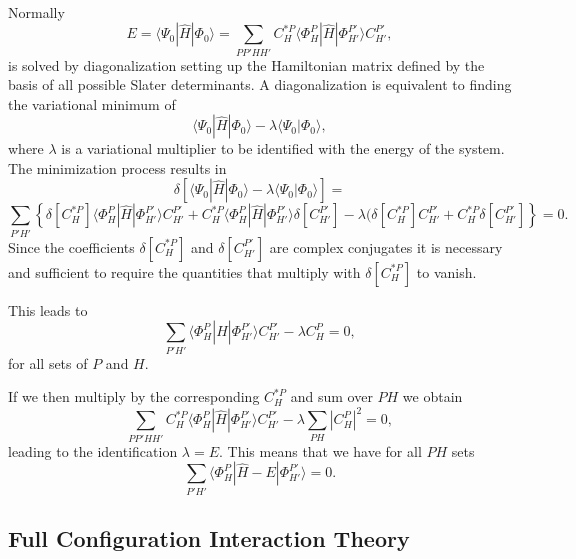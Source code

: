 \documentclass[%
twoside,                 %
final,                   %
10pt]{article}
\begin{document}
\paragraph{}
Normally 
\[
E= \langle \Psi_0 | \hat{H} |\Phi_0 \rangle= \sum_{PP'HH'}C_H^{*P}\langle \Phi_H^P | \hat{H} |\Phi_{H'}^{P'} \rangle C_{H'}^{P'},
\]
is solved by diagonalization setting up the Hamiltonian matrix defined by the basis of all possible Slater determinants. A diagonalization
is equivalent to finding the variational minimum   of 
\[
 \langle \Psi_0 | \hat{H} |\Phi_0 \rangle-\lambda \langle \Psi_0 |\Phi_0 \rangle,
\]
where $\lambda$ is a variational multiplier to be identified with the energy of the system.
The minimization process results in 
\[
\delta\left[ \langle \Psi_0 | \hat{H} |\Phi_0 \rangle-\lambda \langle \Psi_0 |\Phi_0 \rangle\right]=
\]
\[
\sum_{P'H'}\left\{\delta[C_H^{*P}]\langle \Phi_H^P | \hat{H} |\Phi_{H'}^{P'} \rangle C_{H'}^{P'}+
C_H^{*P}\langle \Phi_H^P | \hat{H} |\Phi_{H'}^{P'} \rangle \delta[C_{H'}^{P'}]-
\lambda( \delta[C_H^{*P}]C_{H'}^{P'}+C_H^{*P}\delta[C_{H'}^{P'}]\right\} = 0.
\]
Since the coefficients $\delta[C_H^{*P}]$ and $\delta[C_{H'}^{P'}]$ are complex conjugates it is necessary and sufficient to require the quantities that multiply with $\delta[C_H^{*P}]$ to vanish.  

This leads to 
\[
\sum_{P'H'}\langle \Phi_H^P | \hat{H} |\Phi_{H'}^{P'} \rangle C_{H'}^{P'}-\lambda C_H^{P}=0,
\]
for all sets of $P$ and $H$.

If we then multiply by the corresponding $C_H^{*P}$ and sum over $PH$ we obtain
\[ 
\sum_{PP'HH'}C_H^{*P}\langle \Phi_H^P | \hat{H} |\Phi_{H'}^{P'} \rangle C_{H'}^{P'}-\lambda\sum_{PH}|C_H^P|^2=0,
\]
leading to the identification $\lambda = E$. This means that we have for all $PH$ sets
\begin{equation}
\sum_{P'H'}\langle \Phi_H^P | \hat{H} -E|\Phi_{H'}^{P'} \rangle = 0. \label{eq:fullci}
\end{equation}



\subsection*{Full Configuration Interaction Theory}

\end{document}
